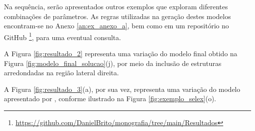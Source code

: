 Na sequência, serão apresentados outros exemplos que exploram diferentes combinações de parâmetros. As regras utilizadas na geração destes modelos encontram-se no Anexo \ref{an:ex_anexo_a}, bem como em um repositório no GitHub \footnote{\href{https://github.com/DanielBrito/monografia/tree/main/Resultados}{https://github.com/DanielBrito/monografia/tree/main/Resultados}}, para uma eventual consulta.

A Figura \ref{fig:resultado_2} representa uma variação do modelo final obtido na Figura \ref{fig:modelo_final_solucao}(j), por meio da inclusão de estruturas arredondadas na região lateral direita.

\begin{figure}[h!]
	\centering
	\captionsetup{width=15cm}
	{}	
\end{figure}

A Figura \ref{fig:resultado_3}(a), por sua vez, representa uma variação do modelo apresentado por , conforme ilustrado na Figura \ref{fig:exemplo_selex}(o).

\begin{figure}[h!]
	\centering
	\captionsetup{width=15cm}
	{}	
\end{figure}

